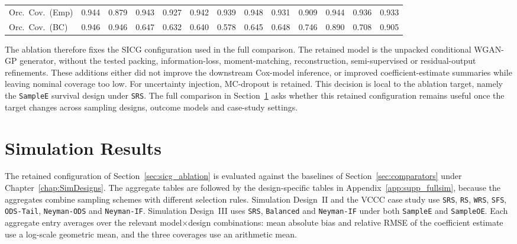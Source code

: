 \begin{landscape}
\begin{table}[!htbp]
{\begin{tabular}{lrrrrrrrrrrrr}
\quad Orc.\ Cov.\ (Emp) & 0.944 & 0.879 & \cellcolor{rankthree}0.943 & 0.927 & 0.942 & 0.939 & \cellcolor{rankone}0.948 & 0.931 & 0.909 & \cellcolor{ranktwo}0.944 & 0.936 & 0.933 \\
\quad Orc.\ Cov.\ (BC) & 0.946 & 0.946 & 0.647 & 0.632 & 0.640 & 0.578 & 0.645 & 0.648 & \cellcolor{rankthree}0.746 & \cellcolor{ranktwo}0.890 & 0.708 & \cellcolor{rankone}0.905 \\
\bottomrule
\end{tabular}}
\end{table}
\end{landscape}

The ablation therefore fixes the SICG configuration used in the full comparison. The retained model is the unpacked conditional WGAN-GP generator, without the tested packing, information-loss, moment-matching, reconstruction, semi-supervised or residual-output refinements. These additions either did not improve the downstream Cox-model inference, or improved coefficient-estimate summaries while leaving nominal coverage too low. For uncertainty injection, MC-dropout is retained. This decision is local to the ablation target, namely the \texttt{SampleE} survival design under \texttt{SRS}. The full comparison in Section~\ref{sec:sicg_sim} asks whether this retained configuration remains useful once the target changes across sampling designs, outcome models and case-study settings.


\section{Simulation Results}
\label{sec:sicg_sim}


The retained configuration of Section~\ref{sec:sicg_ablation} is evaluated against the baselines of Section~\ref{sec:comparators} under Chapter~\ref{chap:SimDesigns}. The aggregate tables are followed by the design-specific tables in Appendix~\ref{app:supp_fullsim}, because the aggregates combine sampling schemes with different selection rules. Simulation Design~II and the VCCC case study use \texttt{SRS}, \texttt{RS}, \texttt{WRS}, \texttt{SFS}, \texttt{ODS-Tail}, \texttt{Neyman-ODS} and \texttt{Neyman-IF}. Simulation Design~III uses \texttt{SRS}, \texttt{Balanced} and \texttt{Neyman-IF} under both \texttt{SampleE} and \texttt{SampleOE}. Each aggregate entry averages over the relevant model$\times$design combinations: mean absolute bias and relative RMSE of the coefficient estimate use a log-scale geometric mean, and the three coverages use an arithmetic mean.

